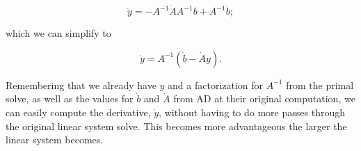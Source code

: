 \begin{equation}
    \dot{y} = -A^{-1}\dot{A}A^{-1}b + A^{-1}\dot{b};
\end{equation}

\where which we can simplify to

\begin{equation}
    \dot{y} = A^{-1}\left(\dot{b}-\dot{A}y\right).
\end{equation}

\noindent Remembering that we already have \(y\) and a factorization for \(A^{-1}\) from the primal solve, as well as the values for \(\dot{b}\) and \(\dot{A}\) from AD at their original computation, we can easily compute the derivative, \(\dot{y}\), without having to do more passes through the original linear system solve.
%
This becomes more advantageous the larger the linear system becomes.


%
%
